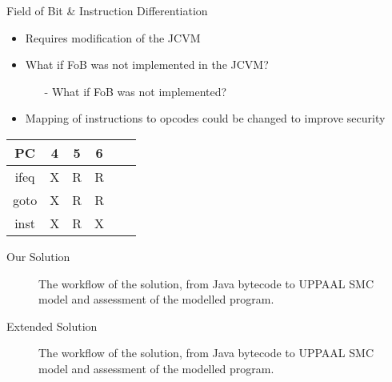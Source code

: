 \begin{frame}[fragile]{Field of Bit \& Instruction Differentiation}
\begin{itemize}
\item Requires modification of the JCVM
\item What if FoB was not implemented in the JCVM?
\begin{itemize}
\item[-] What if FoB was not implemented?
\end{itemize}
\item Mapping of instructions to opcodes could be changed to improve security
\end{itemize}
\begin{table}
\centering
\begin{tabular}{|c|c|c|c|c|c|}
\hline PC & 4 & 5 & 6   \\ 
\hline ifeq & X & R & R \\ 
\hline goto & X & R & R \\ 
\hline inst & X & R & X \\ 
\hline 
\end{tabular} 
\end{table}
\end{frame}

\begin{frame}[fragile]{Our Solution}
\begin{center}
\begin{figure}
\def\svgwidth{\columnwidth}

\caption{The workflow of the solution, from Java bytecode to UPPAAL SMC model and assessment of the modelled program.}
\label{fig:workflow_new}
\end{figure}
\end{center}
\end{frame}


\begin{frame}[fragile]{Extended Solution}

\begin{figure}
\def\svgwidth{\columnwidth}

\caption{The workflow of the solution, from Java bytecode to UPPAAL SMC model and assessment of the modelled program.}
\label{fig:workflow_new}
\end{figure}
\end{frame}